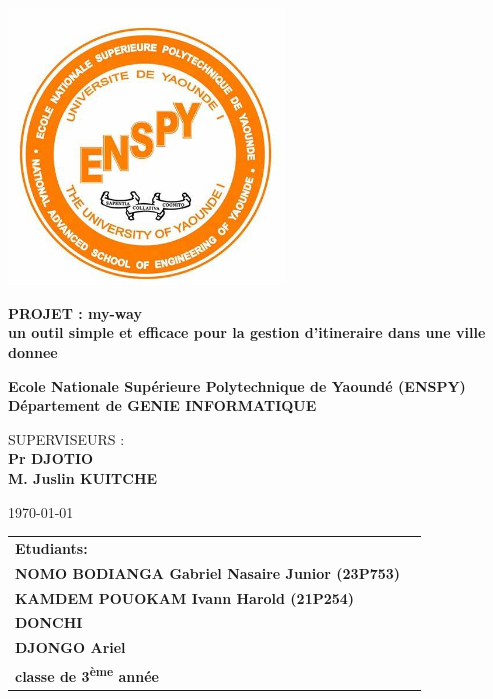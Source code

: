 \begin{titlepage}
  \centering
  \includegraphics[width=0.55\textwidth]{Images/logo.jpg}\par
  \vspace{0.1cm}

  {\LARGE \textbf{ PROJET : my-way\\un outil simple et efficace pour la gestion d'itineraire dans une ville donnee}\par}
  \vspace{0.2cm}
  {\Large \textbf{Ecole Nationale Supérieure Polytechnique de Yaoundé (ENSPY) \\
  Département de GENIE INFORMATIQUE}\par}
  \vspace{0.2cm}
  {\large SUPERVISEURS :\\
  \textbf{Pr DJOTIO \\ M. Juslin KUITCHE}\par}
  \vspace{0.2cm}
  \today\par
  \vspace{0.10cm}
  \hrulefill\par
  \vspace{0.2cm}
  \begin{table}[!htbp]
    \centering
    \large
    \begin{tabular}{l c}
      \textbf{Etudiants:} & \\
      \textbf{NOMO BODIANGA Gabriel Nasaire Junior (23P753) }& \\
       \textbf{KAMDEM POUOKAM Ivann Harold (21P254)}& \\
        \textbf{DONCHI}& \\
         \textbf{DJONGO Ariel  }& \\
    
      \textbf{classe de 3\textsuperscript{ème} année} 
    \end{tabular}
  \end{table}
  \noindent \hrulefill
\end{titlepage}
